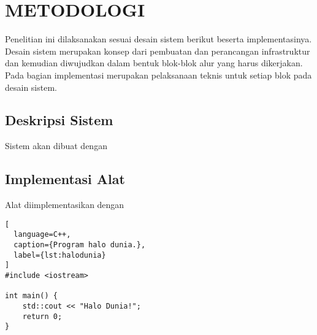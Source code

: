 \chapter{METODOLOGI}
\label{chap:desainimplementasi}


Penelitian ini dilaksanakan sesuai desain sistem berikut beserta implementasinya. 
Desain sistem merupakan konsep dari pembuatan dan perancangan infrastruktur dan kemudian 
diwujudkan dalam bentuk blok-blok alur yang harus dikerjakan. Pada bagian implementasi merupakan 
pelaksanaan teknis untuk setiap blok pada desain sistem.

\section{Deskripsi Sistem}
\label{sec:deskripsisistem}

Sistem akan dibuat dengan \lipsum[1-2]

\section{Implementasi Alat
\label{sec:implementasi alat}}

Alat diimplementasikan dengan \lipsum[1]

\begin{lstlisting}[
  language=C++,
  caption={Program halo dunia.},
  label={lst:halodunia}
]
#include <iostream>

int main() {
    std::cout << "Halo Dunia!";
    return 0;
}
\end{lstlisting}

\lipsum[2-3]



\lipsum[4]
